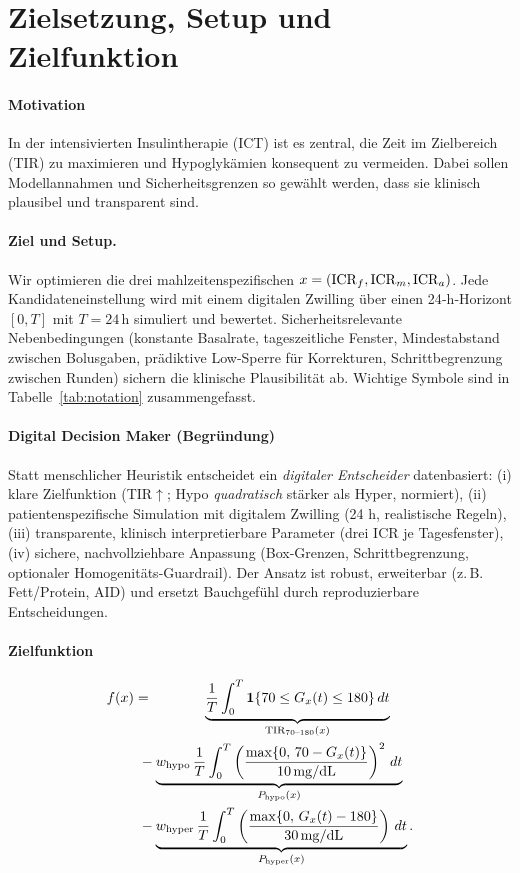 \section{Zielsetzung, Setup und Zielfunktion}

\paragraph{Motivation}
In der intensivierten Insulintherapie (ICT) ist es zentral, die Zeit im Zielbereich (TIR) zu maximieren und Hypoglykämien konsequent zu vermeiden. Dabei sollen Modellannahmen und Sicherheitsgrenzen so gewählt werden, dass sie klinisch plausibel und transparent sind.

\paragraph{Ziel und Setup.}
Wir optimieren die drei mahlzeitenspezifischen \IKRtxtpl{} \(x=(\mathrm{ICR}_f,\mathrm{ICR}_m,\mathrm{ICR}_a)\). Jede Kandidateneinstellung wird mit einem digitalen Zwilling über einen 24‑h‑Horizont \([0,T]\) mit \(T=24\,\mathrm{h}\) simuliert und bewertet. Sicherheitsrelevante Nebenbedingungen (konstante Basalrate, tageszeitliche Fenster, Mindestabstand zwischen Bolusgaben, prädiktive Low‑Sperre für Korrekturen, Schrittbegrenzung zwischen Runden) sichern die klinische Plausibilität ab. Wichtige Symbole sind in Tabelle~\ref{tab:notation} zusammengefasst.


\paragraph{Digital Decision Maker (Begründung)}
Statt menschlicher Heuristik entscheidet ein \emph{digitaler Entscheider} datenbasiert: (i) klare Zielfunktion (TIR$\uparrow$; Hypo \emph{quadratisch} stärker als Hyper, normiert), (ii) patientenspezifische Simulation mit digitalem Zwilling (24 h, realistische Regeln), (iii) transparente, klinisch interpretierbare Parameter (drei ICR je Tagesfenster), (iv) sichere, nachvollziehbare Anpassung (Box-Grenzen, Schrittbegrenzung, optionaler Homogenitäts-Guardrail). Der Ansatz ist robust, erweiterbar (z.\,B. Fett/Protein, AID) und ersetzt Bauchgefühl durch reproduzierbare Entscheidungen.

\paragraph{Zielfunktion}
\begin{align}
f(x)
&= \phantom{-\,w_{\mathrm{hypo}}\,}\underbrace{\frac{1}{T}\int_{0}^{T}\Ind\{70 \le G_{x}(t) \le 180\}\,dt}_{\mathrm{TIR}_{70\text{--}180}(x)} \nonumber\\
&\ - \underbrace{w_{\mathrm{hypo}}\,\frac{1}{T}\int_{0}^{T}\left(\frac{\max\{0,\,70 - G_{x}(t)\}}{\Hhypo}\right)^{2}\,dt}_{P_{\mathrm{hypo}}(x)} \nonumber\\
&\ - \underbrace{w_{\mathrm{hyper}}\,\frac{1}{T}\int_{0}^{T}\left(\frac{\max\{0,\,G_{x}(t) - 180\}}{\Hhyper}\right)\,dt}_{P_{\mathrm{hyper}}(x)}.
\end{align}

